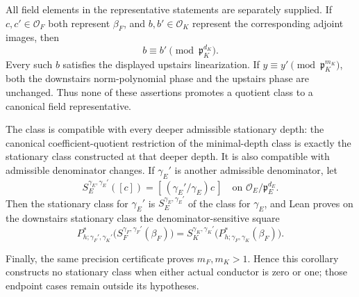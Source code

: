 \begin{corollary}
All field elements in the representative statements are separately supplied.
If $c,c'\in\mathcal O_F$ both represent $\beta_F$, and $b,b'\in\mathcal O_K$
represent the corresponding adjoint images, then
\[
 b\equiv b'\pmod{\mathfrak p_K^{d_K}}.
\]
Every such $b$ satisfies the displayed upstairs linearization.  If
$y\equiv y'\pmod{\mathfrak p_K^{m_K}}$, both the downstairs norm-polynomial
phase and the upstairs phase are unchanged.  Thus none of these assertions
promotes a quotient class to a canonical field representative.

The class is compatible with every deeper admissible stationary depth: the
canonical coefficient-quotient restriction of the minimal-depth class is exactly the
stationary class constructed at that deeper depth.  It is also compatible
with admissible denominator changes.  If $\gamma_E'$ is another admissible
denominator, let
\[
 S_E^{\gamma_E,\gamma_E'}([c])=
   [\,(\gamma_E'/\gamma_E)c\,]
   \quad\text{on }\mathcal O_E/\mathfrak p_E^{d_E}.
\]
Then the stationary class for $\gamma_E'$ is
$S_E^{\gamma_E,\gamma_E'}$ of the class for $\gamma_E$, and Lean proves on
the downstairs stationary class the denominator-sensitive square
\[
 P^*_{h;\gamma_F',\gamma_K'}
   \bigl(S_F^{\gamma_F,\gamma_F'}(\beta_F)\bigr)
 =S_K^{\gamma_K,\gamma_K'}
   \bigl(P^*_{h;\gamma_F,\gamma_K}(\beta_F)\bigr).
\]

Finally, the same precision certificate proves $m_F,m_K>1$.  Hence this
corollary constructs no stationary class when either actual conductor is zero
or one; those endpoint cases remain outside its hypotheses.


\end{corollary}
